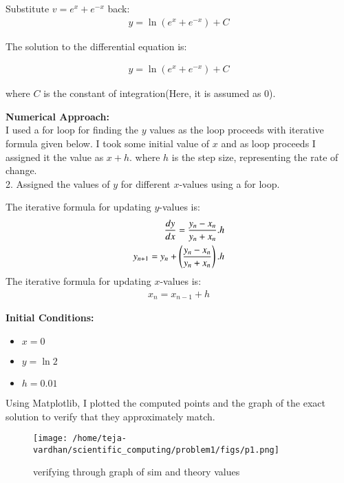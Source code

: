 \documentclass[article]{IEEEtran}
\numberwithin{figure}{enumi}
\begin{document}
\noindent Substitute $v = e^x + e^{-x}$ back:
\begin{align}
   y = \ln(e^x + e^{-x}) + C
\end{align}

\noindent The solution to the differential equation is:

\begin{align}
  \boxed{y = \ln(e^x + e^{-x}) + C}
\end{align}



where $C$ is the constant of integration(Here, it is assumed as 0).

\vspace{0.5em}

\noindent\textbf{Numerical Approach:}\\ I used a for loop for finding the $y$ values as the loop proceeds with iterative formula given below. I took some initial value of $x$ and as loop proceeds I assigned it the value as $x+h$. where $h$ is the step size, representing the rate of change. 
\\2. Assigned the values of $y$ for different $x$-values using a for loop.  

\noindent The iterative formula for updating $y$-values is:  
\begin{align}
    \frac{dy}{dx}=\frac{y_n-x_n}{y_n+x_n}.h\\
    y_{n+1}=y_n+\left(\frac{y_n-x_n}{y_n+x_n}\right).h
\end{align}
The iterative formula for updating $x$-values is: 
\begin{align}
    x_n=x_{n-1}+h
\end{align} 

\noindent\textbf{Initial Conditions:}  
\begin{itemize}
    \item $x = 0$  
    \item $y = \ln2$  
    \item $h = 0.01$  
\end{itemize}

Using Matplotlib, I plotted the computed points and the graph of the exact solution to verify that they approximately match.
\begin{figure}[h!]
	\centering
	\texttt{[image: /home/teja-vardhan/scientific\_computing/problem1/figs/p1.png]}
	\caption{verifying through graph of sim and theory values}
	\label{stemplot}
\end{figure}	
\end{document}
